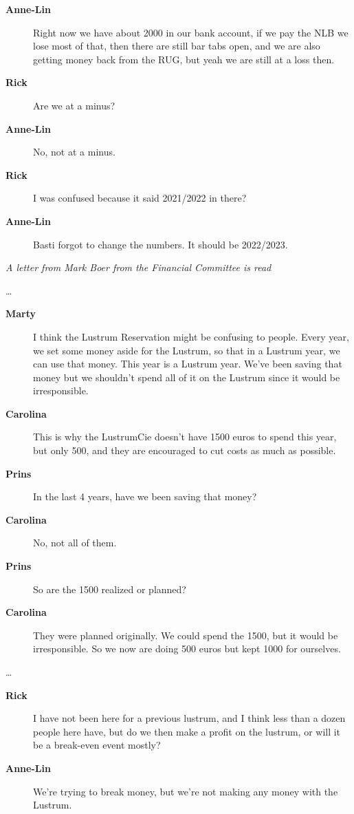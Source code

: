 \documentclass[12pt, a4paper]{article}
\newcommand{\speak}[2]{\begin{description}\item[\textbf{#1}]#2\end{description}}
\begin{document}
\speak{Anne-Lin}{Right now we have about 2000 in our bank account, if we pay the NLB we lose most of that, then there are still bar tabs open, and we are also getting money back from the RUG, but yeah we are still at a loss then.}

\speak{Rick}{Are we at a minus?}

\speak{Anne-Lin}{No, not at a minus.}

\speak{Rick}{I was confused because it said 2021/2022 in there?}

\speak{Anne-Lin}{Basti forgot to change the numbers. It should be 2022/2023.}

\textit{A letter from Mark Boer from the Financial Committee is read}


\dots

\speak{Marty}{I think the Lustrum Reservation might be confusing to people. Every year, we set some money aside for the Lustrum, so that in a Lustrum year, we can use that money. This year is a Lustrum year. We've been saving that money but we shouldn't spend all of it on the Lustrum since it would be irresponsible.}

\speak{Carolina}{This is why the LustrumCie doesn't have 1500 euros to spend this year, but only 500, and they are encouraged to cut costs as much as possible.}

\speak{Prins}{In the last 4 years, have we been saving that money?}

\speak{Carolina}{No, not all of them.}

\speak{Prins}{So are the 1500 realized or planned?}

\speak{Carolina}{They were planned originally. We could spend the 1500, but it would be irresponsible. So we now are doing 500 euros but kept 1000 for ourselves.}


\dots

\speak{Rick}{I have not been here for a previous lustrum, and I think less than a dozen people here have, but do we then make a profit on the lustrum, or will it be a break-even event mostly?}

\speak{Anne-Lin}{We're trying to break money, but we're not making any money with the Lustrum.}
\end{document}
